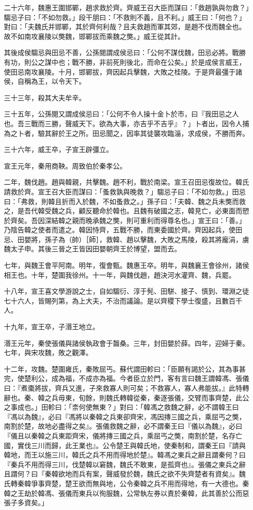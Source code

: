 \begin{pinyinscope}
二十六年，魏惠王圍邯鄲，趙求救於齊。齊威王召大臣而謀曰：「救趙孰與勿救？」騶忌子曰：「不如勿救。」段干朋曰：「不救則不義，且不利。」威王曰：「何也？」對曰：「夫魏氏并邯鄲，其於齊何利哉？且夫救趙而軍其郊，是趙不伐而魏全也。故不如南攻襄陵以獘魏，邯鄲拔而乘魏之獘。」威王從其計。

其後成侯騶忌與田忌不善，公孫閱謂成侯忌曰：「公何不謀伐魏，田忌必將。戰勝有功，則公之謀中也；戰不勝，非前死則後北，而命在公矣。」於是成侯言威王，使田忌南攻襄陵。十月，邯鄲拔，齊因起兵擊魏，大敗之桂陵。于是齊最彊于諸侯，自稱為王，以令天下。

三十三年，殺其大夫牟辛。

三十五年，公孫閱又謂成侯忌曰：「公何不令人操十金卜於市，曰『我田忌之人也。吾三戰而三勝，聲威天下。欲為大事，亦吉乎不吉乎』？」卜者出，因令人捕為之卜者，驗其辭於王之所。田忌聞之，因率其徒襲攻臨淄，求成侯，不勝而奔。

三十六年，威王卒，子宣王辟彊立。

宣王元年，秦用商鞅。周致伯於秦孝公。

二年，魏伐趙。趙與韓親，共擊魏。趙不利，戰於南梁。宣王召田忌復故位。韓氏請救於齊。宣王召大臣而謀曰：「蚤救孰與晚救？」騶忌子曰：「不如勿救。」田忌曰：「弗救，則韓且折而入於魏，不如蚤救之。」孫子曰：「夫韓、魏之兵未獘而救之，是吾代韓受魏之兵，顧反聽命於韓也。且魏有破國之志，韓見亡，必東面而愬於齊矣。吾因深結韓之親而晚承魏之獘，則可重利而得尊名也。」宣王曰：「善。」乃陰告韓之使者而遣之。韓因恃齊，五戰不勝，而東委國於齊。齊因起兵，使田忌、田嬰將，孫子為（帥）［師］，救韓、趙以擊魏，大敗之馬陵，殺其將龐涓，虜魏太子申。其後三晉之王皆因田嬰朝齊王於博望，盟而去。

七年，與魏王會平阿南。明年，復會甄。魏惠王卒。明年，與魏襄王會徐州，諸侯相王也。十年，楚圍我徐州。十一年，與魏伐趙，趙決河水灌齊、魏，兵罷。

十八年，宣王喜文學游說之士，自如騶衍、淳于髡、田駢、接子、慎到、環淵之徒七十六人，皆賜列第，為上大夫，不治而議論。是以齊稷下學士復盛，且數百千人。

十九年，宣王卒，子湣王地立。

湣王元年，秦使張儀與諸侯執政會于齧桑。三年，封田嬰於薛。四年，迎婦于秦。七年，與宋攻魏，敗之觀澤。

十二年，攻魏。楚圍雍氏，秦敗屈丐。蘇代謂田軫曰：「臣願有謁於公，其為事甚完，使楚利公，成為福，不成亦為福。今者臣立於門，客有言曰魏王謂韓馮、張儀曰：『煮棗將拔，齊兵又進，子來救寡人則可矣；不救寡人，寡人弗能拔。』此特轉辭也。秦、韓之兵毋東，旬餘，則魏氏轉韓從秦，秦逐張儀，交臂而事齊楚，此公之事成也。」田軫曰：「柰何使無東？」對曰：「韓馮之救魏之辭，必不謂韓王曰『馮以為魏』，必曰『馮將以秦韓之兵東卻齊宋，馮因摶三國之兵，乘屈丐之獘，南割於楚，故地必盡得之矣』。張儀救魏之辭，必不謂秦王曰『儀以為魏』，必曰『儀且以秦韓之兵東距齊宋，儀將摶三國之兵，乘屈丐之獘，南割於楚，名存亡國，實伐三川而歸，此王業也』。公令楚王與韓氏地，使秦制和，謂秦王曰『請與韓地，而王以施三川，韓氏之兵不用而得地於楚』。韓馮之東兵之辭且謂秦何？曰『秦兵不用而得三川，伐楚韓以窘魏，魏氏不敢東，是孤齊也』。張儀之東兵之辭且謂何？曰『秦韓欲地而兵有案，聲威發於魏，魏氏之欲不失齊楚者有資矣』。魏氏轉秦韓爭事齊楚，楚王欲而無與地，公令秦韓之兵不用而得地，有一大德也。秦韓之王劫於韓馮、張儀而東兵以徇服魏，公常執左券以責於秦韓，此其善於公而惡張子多資矣。」


\end{pinyinscope}
